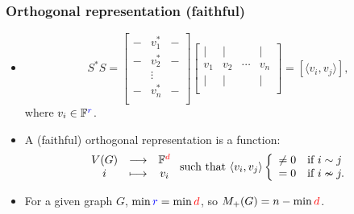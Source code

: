 \documentclass{beamer}
\begin{document}
\begin{frame}
\frametitle{Orthogonal representation (faithful)}
\begin{itemize}
\item 
\[
S^*S=
\begin{bmatrix}
- & v_1^* & - \\
- & v_2^* & - \\
 ~  & \vdots & ~ \\
- & v_n^* & -\\
\end{bmatrix}
\begin{bmatrix}
| & | & ~ & | \\
v_1 & v_2 & \cdots & v_n \\
| & | & ~ & | \\
\end{bmatrix}
=[\langle v_i, v_j \rangle],
\]
where $v_i\in \mathbb{F}^{\color{blue} r}$.
\item A (faithful) \alert{orthogonal representation} is a function:
\[
\begin{array}{ccc}
V(G) & \longrightarrow & \mathbb{F}^{\color{red} d} \\
i & \longmapsto & v_i 
\end{array}
\text{ such that }
\langle v_i,v_j\rangle \left\{\begin{array}{ll} \neq 0 & \text{if } i\sim j \\ =0 & \text{if } i\nsim j. \end{array}\right.
\]
\item For a given graph $G$, $\min {\color{blue} r} = \min {\color{red} d}$, so $M_+(G)= n-  \min {\color{red} d}$.
\end{itemize}

\end{frame}

\end{document}
